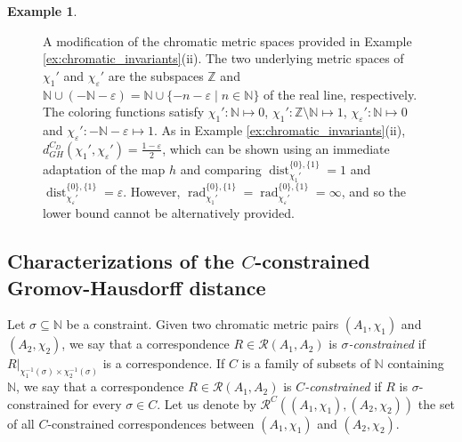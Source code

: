 \documentclass[8pt,a4paper,oneside,english,english]{article}
\theoremstyle{plain}
\theoremstyle
{plain}
\theoremstyle{definition}
\newtheorem{example}[theorem]{Example}%
\newcommand{\N}{\mathbb{N}}
\newcommand{\Z}{\mathbb{Z}}
\newcommand{\GH}{d_{GH}}
\newcommand{\MP}[1]{(A_{#1},\chi_{#1})}
\DeclareMathOperator{\dist}{dist}
\DeclareMathOperator{\rad}{rad}
\begin{document}
\begin{example}
\begin{compactenum}[(i)]
\begin{figure}
    \caption{\footnotesize A modification of the chromatic metric spaces provided in Example \ref{ex:chromatic_invariants}(ii). The two underlying metric spaces of $\chi_1'$ and $\chi_\varepsilon'$ are the subspaces $\Z$ and $\N\cup(-\N-\varepsilon)=\N\cup\{-n-\varepsilon\mid n\in\N\}$ of the real line, respectively. The coloring functions satisfy $\chi_1'\colon\N\mapsto 0$, $\chi_1'\colon\Z\setminus\N\mapsto 1$, $\chi_\varepsilon'\colon\N\mapsto 0$ and $\chi_\varepsilon'\colon-\N-\varepsilon\mapsto 1$. As in Example \ref{ex:chromatic_invariants}(ii), $\GH^{C_D}(\chi_1',\chi_\varepsilon')=\tfrac{1-\varepsilon}{2}$, which can be shown using an immediate adaptation of the map $h$ and comparing $\dist_{\chi_1'}^{\{0\},\{1\}}=1$ and $\dist_{\chi_\varepsilon'}^{\{0\},\{1\}}=\varepsilon$. However, $\rad_{\chi_1'}^{\{0\},\{1\}}=\rad_{\chi_\varepsilon'}^{\{0\},\{1\}}=\infty$, and so the lower bound cannot be alternatively provided.}
    \label{fig:dist_3}
\end{figure}



\end{compactenum}
\end{example}

 
    
\subsection{Characterizations of the $C$-constrained Gromov-Hausdorff distance}\label{sub:characterisations}


Let $\sigma\subseteq\N$ be a constraint. Given two chromatic metric pairs $\MP{1}$ and $\MP{2}$, we say that a correspondence $R\in\mathcal R(A_1,A_2)$ is {\em $\sigma$-constrained} if $R|_{\chi_1^{-1}(\sigma)\times\chi_2^{-1}(\sigma)}$ is a correspondence. If $C$ is a family of subsets of $\N$ containing $\N$, we say that a correspondence $R\in\mathcal R(A_1,A_2)$ is {\em $C$-constrained} if $R$ is $\sigma$-constrained for every $\sigma\in C$. Let us denote by $\mathcal R^C(\MP{1},\MP{2})$ the set of all $C$-constrained correspondences between $\MP{1}$ and $\MP{2}$.
\end{document}
